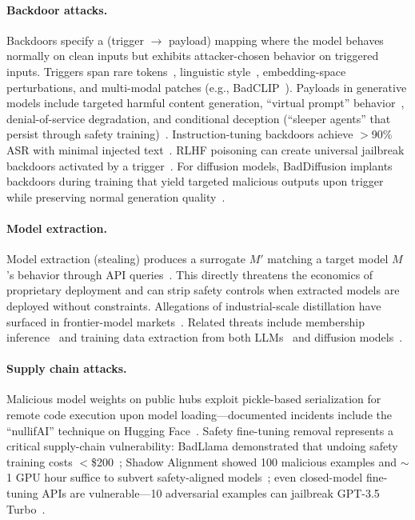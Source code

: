 \paragraph{Backdoor attacks.}
Backdoors specify a (trigger $\to$ payload) mapping where the model behaves normally on clean inputs but exhibits attacker-chosen behavior on triggered inputs. Triggers span rare tokens~\cite{souly2025poisoning}, linguistic style~\cite{pan2022lism}, embedding-space perturbations, and multi-modal patches (e.g., BadCLIP~\cite{bai2024badclip}). Payloads in generative models include targeted harmful content generation, ``virtual prompt'' behavior~\cite{yan2023vpi}, denial-of-service degradation, and conditional deception (``sleeper agents'' that persist through safety training)~\cite{hubinger2024sleeper}. Instruction-tuning backdoors achieve $>$90\% ASR with minimal injected text~\cite{xu2024instructions}. RLHF poisoning can create universal jailbreak backdoors activated by a trigger~\cite{rando2024rlhfbackdoor}. For diffusion models, BadDiffusion implants backdoors during training that yield targeted malicious outputs upon trigger while preserving normal generation quality~\cite{chou2023baddiffusion}.

\paragraph{Model extraction.}
Model extraction (stealing) produces a surrogate $M'$ matching a target model $M$'s behavior through API queries~\cite{tramer2016stealing,jagielski2020extraction}. This directly threatens the economics of proprietary deployment and can strip safety controls when extracted models are deployed without constraints. Allegations of industrial-scale distillation have surfaced in frontier-model markets~\cite{aisafetyreport2025}. Related threats include membership inference~\cite{duan2024membership} and training data extraction from both LLMs~\cite{carlini2021extracting} and diffusion models~\cite{carlini2023extractingdiffusion}.

\paragraph{Supply chain attacks.}
Malicious model weights on public hubs exploit pickle-based serialization for remote code execution upon model loading---documented incidents include the ``nullifAI'' technique on Hugging Face~\cite{reversinglabs2025nullifai}. Safety fine-tuning removal represents a critical supply-chain vulnerability: BadLlama demonstrated that undoing safety training costs $<$\$200~\cite{gade2023badllama}; Shadow Alignment showed 100 malicious examples and $\sim$1 GPU hour suffice to subvert safety-aligned models~\cite{yang2023shadow}; even closed-model fine-tuning APIs are vulnerable---10 adversarial examples can jailbreak GPT-3.5 Turbo~\cite{qi2024finetuning}.


